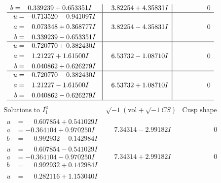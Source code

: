 \documentclass[1p]{elsarticle_modified}
\theoremstyle{definition}
\newcommand{\I}{\sqrt{-1}}
\begin{document}
$$\begin{array}{c|c|c}
\begin{aligned}
b &= \phantom{-}0.339239 + 0.653351 I\end{aligned}
 & \phantom{-}3.82254 + 4.35831 I & \phantom{-0.000000 } 0 \\ \hline\begin{aligned}
u &= -0.713520 - 0.941097 I \\
a &= \phantom{-}0.073348 + 0.368777 I \\
b &= \phantom{-}0.339239 - 0.653351 I\end{aligned}
 & \phantom{-}3.82254 - 4.35831 I & \phantom{-0.000000 } 0 \\ \hline\begin{aligned}
u &= -0.720770 + 0.382430 I \\
a &= \phantom{-}1.21227 + 1.61500 I \\
b &= \phantom{-}0.040862 + 0.626279 I\end{aligned}
 & \phantom{-}6.53732 - 1.08710 I & \phantom{-0.000000 } 0 \\ \hline\begin{aligned}
u &= -0.720770 - 0.382430 I \\
a &= \phantom{-}1.21227 - 1.61500 I \\
b &= \phantom{-}0.040862 - 0.626279 I\end{aligned}
 & \phantom{-}6.53732 + 1.08710 I & \phantom{-0.000000 } 0\\
 \hline 
 \end{array}$$\newpage$$\begin{array}{c|c|c}  
\text{Solutions to }I^u_{1}& \I (\text{vol} + \sqrt{-1}CS) & \text{Cusp shape}\\
 \hline 
\begin{aligned}
u &= \phantom{-}0.607854 + 0.541029 I \\
a &= -0.364104 + 0.970250 I \\
b &= \phantom{-}0.992932 - 0.142984 I\end{aligned}
 & \phantom{-}7.34314 - 2.99182 I & \phantom{-0.000000 } 0 \\ \hline\begin{aligned}
u &= \phantom{-}0.607854 - 0.541029 I \\
a &= -0.364104 - 0.970250 I \\
b &= \phantom{-}0.992932 + 0.142984 I\end{aligned}
 & \phantom{-}7.34314 + 2.99182 I & \phantom{-0.000000 } 0 \\ \hline\begin{aligned}
u &= \phantom{-}0.282116 + 1.153040 I \\

\end{aligned}
\end{array}$$
\end{document}
